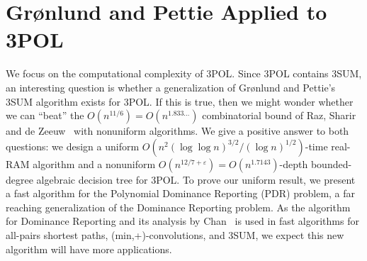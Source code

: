 \section{Gr\o nlund and Pettie Applied to 3POL}


%

%

We focus on the computational complexity of 3POL\@. Since 3POL contains 3SUM,
an interesting question is whether a generalization of Gr\o nlund and Pettie's
3SUM algorithm exists for 3POL\@. If this is true, then we might wonder whether
we can ``beat'' the $O(n^{11/6}) = O(n^{1.833\ldots})$ combinatorial bound of Raz,
Sharir and de Zeeuw~\cite{RSZ15} with nonuniform algorithms. We give a positive
answer to both questions: we design
a uniform
$O(n^2 {(\log \log n)}^{3/2} / {(\log n)}^{1/2})$-time
real-RAM algorithm
and
a nonuniform
$O(n^{12/7+\varepsilon}) = O(n^{1.7143})$-depth
bounded-degree algebraic decision tree
for 3POL\@.
%
To prove our uniform result, we present a fast algorithm for the Polynomial
Dominance Reporting (PDR) problem, a far reaching generalization of the
Dominance Reporting problem. As the algorithm for Dominance Reporting and its
analysis by Chan~\cite{Cha08} is used in fast algorithms for all-pairs shortest
paths, (min,+)-convolutions, and 3SUM, we expect this new algorithm will have
more applications.

